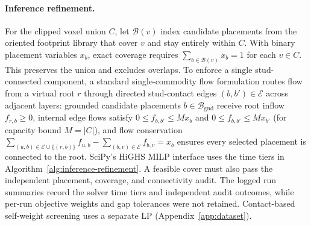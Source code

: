 \documentclass[letterpaper]{article} %
\begin{document}
\paragraph{Inference refinement.}
For the clipped voxel union $C$, let $\mathcal{B}(v)$ index candidate placements from the oriented footprint library that cover $v$ and stay entirely within $C$. With binary placement variables $x_b$, exact coverage requires $\sum_{b\in\mathcal{B}(v)}x_b=1$ for each $v\in C$. This preserves the union and excludes overlaps. To enforce a single stud-connected component, a standard single-commodity flow formulation routes flow from a virtual root $r$ through directed stud-contact edges $(b,b')\in\mathcal{E}$ across adjacent layers: grounded candidate placements $b\in\mathcal{B}_{\mathrm{gnd}}$ receive root inflow $f_{r,b}\ge 0$, internal edge flows satisfy $0\le f_{b,b'}\le M x_b$ and $0\le f_{b,b'}\le M x_{b'}$ (for capacity bound $M=|C|$), and flow conservation $\sum_{(u,b)\in\mathcal{E}\cup\{(r,b)\}} f_{u,b} - \sum_{(b,v)\in\mathcal{E}} f_{b,v} = x_b$ ensures every selected placement is connected to the root. SciPy's HiGHS MILP interface uses the time tiers in Algorithm~\ref{alg:inference-refinement}. A feasible cover must also pass the independent placement, coverage, and connectivity audit. The logged run summaries record the solver time tiers and independent audit outcomes, while per-run objective weights and gap tolerances were not retained. Contact-based self-weight screening uses a separate LP (Appendix~\ref{app:dataset}).
\end{document}
